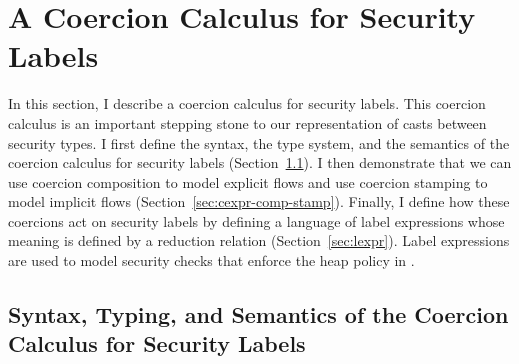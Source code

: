 
\section{A Coercion Calculus for Security Labels}
\label{sec:coercion-calc-labels}

In this section, I describe a coercion calculus for security labels. This
coercion calculus is an important stepping stone to our representation of casts
between security types. I first define the syntax, the type system, and the
semantics of the coercion calculus for security labels
(Section~\ref{sec:coercion-calc-def}). I then demonstrate that we can use
coercion composition to model explicit flows and use coercion stamping to model
implicit flows (Section~\ref{sec:cexpr-comp-stamp}). Finally, I define how these
coercions act on security labels by defining a language of label expressions
whose meaning is defined by a reduction relation (Section~\ref{sec:lexpr}).
Label expressions are used to model security checks that enforce the heap policy
in \CC.

\subsection{Syntax, Typing, and Semantics of the Coercion Calculus for Security Labels}
\label{sec:coercion-calc-def}

